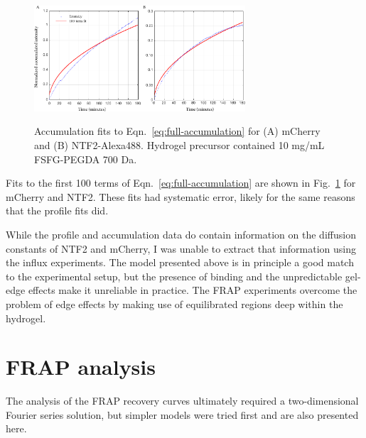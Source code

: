 \begin{figure}
\caption[Fits to accumulation curves.]{Accumulation fits to Eqn.~\ref{eq:full-accumulation} for (A) mCherry and (B) NTF2-Alexa488.  Hydrogel precursor contained 10 mg/mL FSFG-PEGDA 700 Da.}
\centering
\includegraphics[width=0.7\textwidth]{figs/ch04/accumulation.pdf}
\label{fig:acc}
\end{figure} 


Fits to the first 100 terms of Eqn.~\ref{eq:full-accumulation} are shown in Fig.~\ref{fig:acc} for mCherry and NTF2.  These fits had systematic error, likely for the same reasons that the profile fits did.

While the profile and accumulation data do contain information on the diffusion constants of NTF2 and mCherry, I was unable to extract that information using the influx experiments.  The model presented above is in principle a good match to the experimental setup, but the presence of binding and the unpredictable gel-edge effects make it unreliable in practice.  The FRAP experiments overcome the problem of edge effects by making use of equilibrated regions deep within the hydrogel.

\section{FRAP analysis}
The analysis of the FRAP recovery curves ultimately required a two-dimensional Fourier series solution, but simpler models were tried first and are also presented here.

\label{sec:FRAP-analysis}

